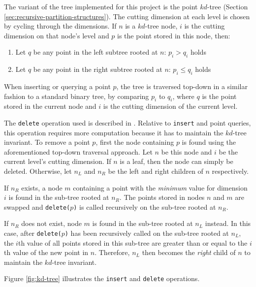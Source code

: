 The variant of the tree implemented for this project is the point $kd$-tree (Section \ref{sec:recursive-partition-structures}). The cutting dimension at each level is chosen by cycling through the dimensions. If $n$ is a $kd$-tree node, $i$ is the cutting dimension on that node's level and $p$ is the point stored in this node, then:
\begin{enumerate}
	\item Let $q$ be any point in the left subtree rooted at $n$: $p_i > q_i$ holds
	\item Let $q$ be any point in the right subtree rooted at $n$: $p_i \leq q_i$ holds
\end{enumerate}
When inserting or querying a point $p$, the tree is traversed top-down in a similar fashion to a standard binary tree, by comparing $p_i$ to $q_i$, where $q$ is the point stored in the current node and $i$ is the cutting dimension of the current level.

The \texttt{delete} operation used is described in \cite{kdtree-remove}. Relative to \texttt{insert} and point queries, this operation requires more computation because it has to maintain the $kd$-tree invariant. To remove a point $p$, first the node containing $p$ is found using the aforementioned top-down traversal approach. Let $n$ be this node and $i$ be the current level's cutting dimension. If $n$ is a leaf, then the node can simply be deleted. Otherwise, let $n_L$ and $n_R$ be the left and right children of $n$ respectively. 

If $n_R$ exists, a node $m$ containing a point with the \textit{minimum} value for dimension $i$ is found in the sub-tree rooted at $n_R$. The points stored in nodes $n$ and $m$ are swapped and \texttt{delete($p$)} is called recursively on the sub-tree rooted at $n_R$.

If $n_R$ does not exist, node $m$ is found in the sub-tree rooted at $n_L$ instead. In this case, after \texttt{delete($p$)} has been recursively called on the sub-tree rooted at $n_L$, the $i$th value of all points stored in this sub-tree are greater than or equal to the $i$th value of the new point in $n$. Therefore, $n_L$ then becomes the \textit{right} child of $n$ to maintain the $kd$-tree invariant. 

Figure \ref{fig:kd-tree} illustrates the \texttt{insert} and \texttt{delete} operations.

